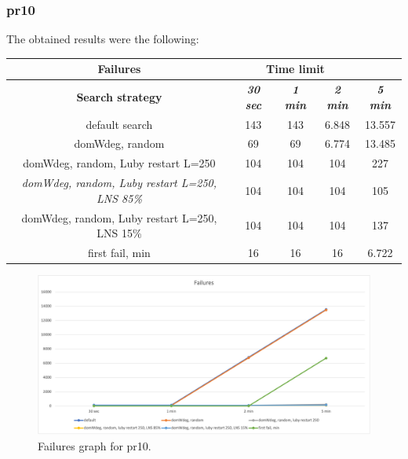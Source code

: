 \subsubsection{pr10}
The obtained results were the following:
{
\renewcommand{\arraystretch}{2}
\begin{longtable}[h]{| c | c | c | c | c |}
    \hline
    \textbf{Failures} & \multicolumn{3}{c}{Time limit} & \\
    \hline
    \textbf{Search strategy} & \textbf{\textit{30 sec}} & \textbf{\textit{1 min}} & \textbf{\textit{2 min}} & \textbf{\textit{5 min}} \\
    \hline
    \endhead
    default search                                         & 143 &  143 &  6.848 & 13.557 \\
    \hline
    domWdeg, random                                        &  69 &   69 &  6.774 & 13.485 \\
    \hline
    domWdeg, random, Luby restart L=250                    & 104 &  104 &  104 &    227 \\
    \hline
    \textit{domWdeg, random, Luby restart L=250, LNS 85\%} & 104 &  104 &  104 &    105 \\
    \hline
    domWdeg, random, Luby restart L=250, LNS 15\%          & 104 &  104 &  104 &    137 \\
    \hline
    first fail, min                                        &  16 &   16 &   16 &   6.722 \\
    \hline
\end{longtable}
}
\begin{figure}[H]
    \centering
    \includegraphics[width=1.0\columnwidth]{../graphs/pr10-failures.png}
    \caption{Failures graph for pr10.}
\end{figure}

